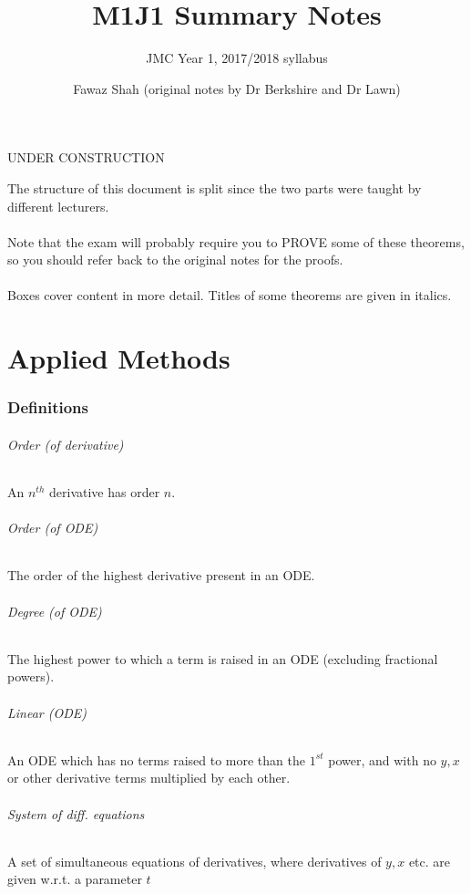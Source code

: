 \documentclass{scrartcl}
\title{M1J1 Summary Notes}
\subtitle{JMC Year 1, 2017/2018 syllabus}
\date{}
\author{Fawaz Shah (original notes by Dr Berkshire and Dr Lawn)}
\begin{document}
\large
\maketitle
\begin{center}
UNDER CONSTRUCTION
\end{center}
\noindent The structure of this document is split since the two parts were taught by different lecturers.
\\\\
Note that the exam will probably require you to PROVE some of these theorems, so you should refer back to the original notes for the proofs.
\\\\
Boxes cover content in more detail. Titles of some theorems are given in italics.
\tableofcontents
\newpage
\part{Applied Methods}

\section{Definitions}

\paragraph{Order (of derivative)}
An $ n^{th} $ derivative has order $ n $.

\paragraph{Order (of ODE)}
The order of the highest derivative present in an ODE.

\paragraph{Degree (of ODE)}
The highest power to which a term is raised in an ODE (excluding fractional powers).

\paragraph*{Linear (ODE)}
An ODE which has no terms raised to more than the $ 1^{st} $ power, and with no $ y, x $ or other derivative terms multiplied by each other.

\paragraph{System of diff. equations}
A set of simultaneous equations of derivatives, where derivatives of $ y, x $ etc. are given w.r.t. a parameter $ t $
\end{document}

